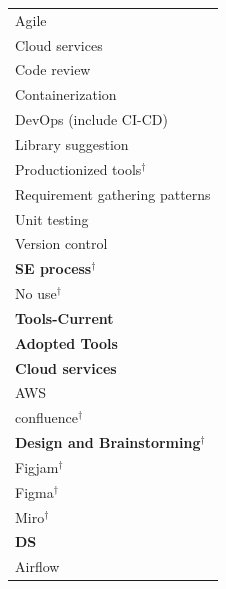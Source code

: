 \documentclass[11pt]{article}
\begin{document}
\begin{longtable}{@{}p{15cm}@{}}
\hspace*{1.5em}Agile \\
\hspace*{1.5em}Cloud services \\
\hspace*{1.5em}Code review \\
\hspace*{1.5em}Containerization \\
\hspace*{1.5em}DevOps (include CI-CD) \\
\hspace*{1.5em}Library suggestion \\
\hspace*{1.5em}Productionized tools$^\dagger$ \\
\hspace*{1.5em}Requirement gathering patterns \\
\hspace*{1.5em}Unit testing \\
\hspace*{1.5em}Version control \\
\hspace*{0.0em}\textbf{SE process}$^\dagger$ \\
\hspace*{1.5em}No use$^\dagger$ \\
\hspace*{0.0em}\textbf{Tools-Current} \\
\hspace*{1.5em}\textbf{Adopted Tools} \\
\hspace*{3.0em}\textbf{Cloud services} \\
\hspace*{4.5em}AWS \\
\hspace*{3.0em}confluence$^\dagger$ \\
\hspace*{3.0em}\textbf{Design and Brainstorming}$^\dagger$ \\
\hspace*{4.5em}Figjam$^\dagger$ \\
\hspace*{4.5em}Figma$^\dagger$ \\
\hspace*{4.5em}Miro$^\dagger$ \\
\hspace*{3.0em}\textbf{DS} \\
\hspace*{4.5em}Airflow \\

\end{longtable}
\end{document}
